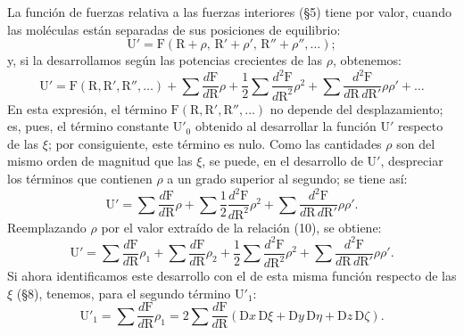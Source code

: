 La función de fuerzas relativa a las fuerzas interiores (§5) tiene por
valor, cuando las moléculas están separadas de sus posiciones de
equilibrio:
\[
\mathrm{U}'=\mathrm{F}(\mathrm{R}+\rho,\,\mathrm{R}'+\rho',\,\mathrm{R}''+\rho'',\ldots);
\]
y, si la desarrollamos según las potencias crecientes de las $\rho$,
obtenemos:
\[
\mathrm{U}'=\mathrm{F}(\mathrm{R},\mathrm{R}',\mathrm{R}'',\ldots)
+\sum\frac{d\mathrm{F}}{d\mathrm{R}}\rho
+\frac12\sum\frac{d^2\mathrm{F}}{d\mathrm{R}^2}\rho^2
+\sum\frac{d^2\mathrm{F}}{d\mathrm{R}\,d\mathrm{R}'}\rho\rho'+\ldots
\]
En esta expresión, el término $\mathrm{F}(\mathrm{R},\mathrm{R}',\mathrm{R}'',\ldots)$
no depende del desplazamiento; es, pues, el término constante
$\mathrm{U}'_0$ obtenido al desarrollar la función $\mathrm{U}'$ respecto
de las $\xi$; por consiguiente, este término es nulo. Como las cantidades
$\rho$ son del mismo orden de magnitud que las $\xi$, se puede, en el
desarrollo de $\mathrm{U}'$, despreciar los términos que contienen $\rho$ a
un grado superior al segundo; se tiene así:
\[
\mathrm{U}'=\sum\frac{d\mathrm{F}}{d\mathrm{R}}\rho
+\sum\frac12\frac{d^2\mathrm{F}}{d\mathrm{R}^2}\rho^2
+\sum\frac{d^2\mathrm{F}}{d\mathrm{R}\,d\mathrm{R}'}\rho\rho'.
\]
Reemplazando $\rho$ por el valor extraído de la relación (10), se obtiene:
\begin{equation}
\mathrm{U}'=\sum\frac{d\mathrm{F}}{d\mathrm{R}}\rho_1
+\sum\frac{d\mathrm{F}}{d\mathrm{R}}\rho_2
+\frac12\sum\frac{d^2\mathrm{F}}{d\mathrm{R}^2}\rho^2
+\sum\frac{d^2\mathrm{F}}{d\mathrm{R}\,d\mathrm{R}'}\rho\rho'.
\tag{11}
\end{equation}
Si ahora identificamos este desarrollo con el de esta misma función
respecto de las $\xi$ (§8), tenemos, para el segundo término
$\mathrm{U}'_1$:
\begin{equation}
\mathrm{U}'_1=\sum\frac{d\mathrm{F}}{d\mathrm{R}}\rho_1
=2\sum\frac{d\mathrm{F}}{d\mathrm{R}}(\mathrm{D}x\,\mathrm{D}\xi+\mathrm{D}y\,\mathrm{D}\eta+\mathrm{D}z\,\mathrm{D}\zeta).
\tag{12}
\end{equation}

